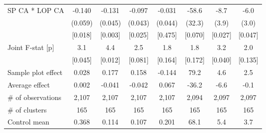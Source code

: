 \begin{tabular}{lccccccc}
SP CA * LOP CA & -0.140\hphantom{-} & -0.131\hphantom{-} & -0.097\hphantom{-} & -0.031\hphantom{-} & -58.6\hphantom{-} & -8.7\hphantom{-} & -6.0\hphantom{-} \\
 & (0.059) & (0.045) & (0.043) & (0.044) & (32.3) & (3.9) & (3.0) \\
 & [0.018] & [0.003] & [0.025] & [0.475] & [0.070] & [0.027] & [0.047] \\
Joint F-stat [p] & 3.1 & 4.4 & 2.5 & 1.8 & 1.8 & 3.2 & 2.0 \\
 & [0.045] & [0.012] & [0.081] & [0.164] & [0.172] & [0.040] & [0.135] \\
\cmidrule(lr){1-8}
Sample plot effect & 0.028 & 0.177 & 0.158 & -0.144 & 79.2 & 4.6 & 2.5 \\
Average effect & 0.002 & -0.041 & -0.042 & 0.067 & -36.2 & -6.6 & -0.1 \\
\hline
\# of observations & 2,107 & 2,107 & 2,107 & 2,107 & 2,094 & 2,097 & 2,097 \\
\# of clusters & 165 & 165 & 165 & 165 & 165 & 165 & 165 \\
Control mean & 0.368 & 0.114 & 0.107 & 0.201 & 68.1 & 5.4 & 3.7 \\
\hline
\end{tabular}
